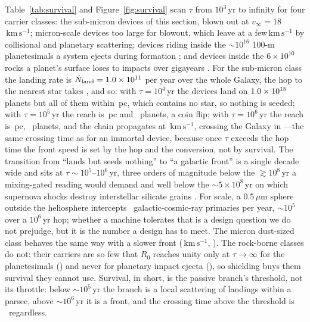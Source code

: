 \documentclass[11pt]{article}
\newcommand{\um}{\ensuremath{\,\mu\mathrm{m}}\xspace}
\newcommand{\kms}{\ensuremath{\,\mathrm{km\,s^{-1}}}\xspace}
\begin{document}
Table~\ref{tab:survival} and Figure~\ref{fig:survival} scan $\tau$ from
$10^{3}$\,yr to infinity for four carrier classes: the sub-micron devices of
this section, blown out at $v_\infty=18$\kms; micron-scale devices too large
for blowout, which leave at a few\kms by collisional and planetary scattering;
devices riding inside the $\sim10^{16}$ 100-m planetesimals a system ejects
during formation \citep{Do2018}; and devices inside the $6\times10^{10}$ rocks
a planet's surface loses to impacts over gigayears \citep{SirajLoeb2020grazing}.
For the sub-micron class the landing rate is $\dot N_{\rm land}=1.0\times10^{11}$
per year over the whole Galaxy, the hop to the nearest star takes
\SurvGrainTHop, and so: with $\tau=10^{4}$\,yr the devices land on
$1.0\times10^{15}$ planets but all of them within \SurvGrainReachTenKyr\,pc,
which contains no star, so nothing is seeded; with $\tau=10^{5}$\,yr the reach
is \SurvGrainReachHundredKyr\,pc and \SurvGrainPlanetsHundredKyr\ planets, a
coin flip; with $\tau=10^{6}$\,yr the reach is \SurvGrainReachMyr\,pc,
\SurvGrainPlanetsMyr\ planets, and the chain propagates at
\SurvGrainVFront\kms, crossing the Galaxy in \SurvGrainTGalMyr---the same
crossing time as for an immortal device, because once $\tau$ exceeds the hop
time the front speed is set by the hop and the conversion, not by survival.
The transition from ``lands but seeds nothing'' to ``a galactic front'' is a
single decade wide and sits at $\tau\sim10^{5}$--$10^{6}$\,yr, three orders of
magnitude below the $\gtrsim10^{8}$\,yr a mixing-gated reading would demand
and well below the $\sim5\times10^{8}$\,yr on which supernova shocks destroy
interstellar silicate grains \citep{Jones1996}.  For scale, a 0.5\um sphere
outside the heliosphere intercepts \SurvGrainCrHits\ galactic-cosmic-ray
primaries per year, $\sim10^{5}$ over a $10^{6}$\,yr hop; whether a machine
tolerates that is a design question we do not prejudge, but it is the number
a design has to meet.  The micron dust-sized class behaves the same way with a
slower front (\SurvDustVFront\kms, \SurvDustTGalInf).  The rock-borne classes
do not: their carriers are so few that $R_{0}$ reaches unity only at
$\tau\to\infty$ for the planetesimals (\SurvIsoRZeroInf) and never for
planetary impact ejecta (\SurvRockRZeroInf), so shielding buys them survival
they cannot use.  Survival, in short, is the passive branch's threshold, not
its throttle: below $\sim10^{5}$\,yr the branch is a local scattering of
landings within a parsec, above $\sim10^{6}$\,yr it is a front, and the
crossing time above the threshold is \SurvGrainTGalInf\ regardless.
\end{document}
